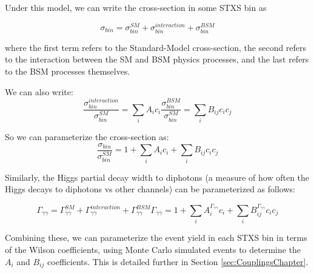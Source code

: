 Under this model, we can write the cross-section in some STXS bin as 

\begin{equation}
\sigma_{bin} =  \sigma_{bin}^{SM} + \sigma_{bin}^{interaction} + \sigma_{bin}^{BSM}
\end{equation}

where the first term refers to the Standard-Model cross-section, the second refers to the interaction between the SM and BSM physics processes, and the last refers to the BSM processes themselves.

We can also write:
\begin{equation}
\frac{\sigma_{bin}^{interaction}}{\sigma_{bin}^{SM}} = \sum_{i} A_{i} c_{i}
\frac{\sigma_{bin}^{BSM}}{\sigma_{bin}^{SM}} = \sum_{i} B_{ij} c_{i} c_{j}
\end{equation}

So we can parameterize the cross-section as:
\begin{equation}
\frac{\sigma_{bin}}{\sigma_{bin}^{SM}} = 1 + \sum_{i} A_{i} c_{i} + \sum_{i} B_{ij} c_{i} c_{j}
\end{equation}

Similarly, the Higgs partial decay width to diphotons (a measure of how often the Higgs decays to diphotons vs other channels) can be parameterized as follows:

\begin{equation}
\Gamma_{\gamma \gamma} = \Gamma_{\gamma \gamma}^{SM} + \Gamma_{\gamma \gamma}^{interaction} + \Gamma_{\gamma \gamma}^{BSM}
\Gamma_{\gamma \gamma} = 1 + \sum_{i} A_{i}^{\Gamma_{\gamma \gamma}} c_{i} + \sum_{i} B_{ij}^{\Gamma_{\gamma \gamma}} c_{i} c_{j}
\end{equation}

Combining these, we can parameterize the event yield in each STXS bin in terms of the Wilson coefficients, using Monte Carlo simulated events to determine the $A_{i}$ and $B_{ij}$ coefficients. This is detailed further in Section \ref{sec:CouplingsChapter}.
\fi